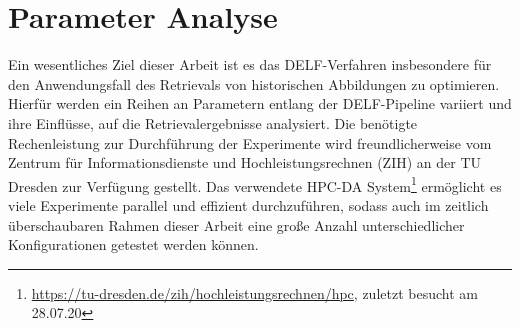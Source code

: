 \section{Parameter Analyse}

Ein wesentliches Ziel dieser Arbeit ist es das DELF-Verfahren insbesondere für den Anwendungsfall des Retrievals von historischen Abbildungen zu optimieren. Hierfür werden ein Reihen an Parametern entlang der DELF-Pipeline variiert und ihre Einflüsse, auf die Retrievalergebnisse analysiert.
Die benötigte Rechenleistung zur Durchführung der Experimente wird freundlicherweise vom 
Zentrum für Informationsdienste und Hochleistungsrechnen (ZIH) an der TU Dresden zur Verfügung gestellt. Das verwendete HPC-DA System\footnote{\url{https://tu-dresden.de/zih/hochleistungsrechnen/hpc}, zuletzt besucht am 28.07.20} ermöglicht es viele Experimente parallel und effizient durchzuführen, sodass auch im zeitlich überschaubaren Rahmen dieser Arbeit eine große Anzahl unterschiedlicher Konfigurationen getestet werden können.

